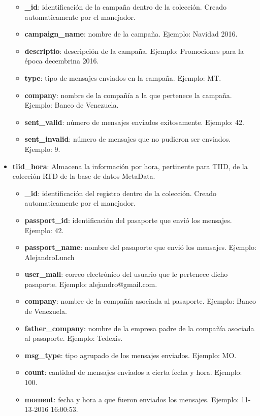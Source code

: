 \begin{itemize}[noitemsep,nolistsep]
\begin{itemize}[noitemsep,nolistsep]
\item \textbf{\_id}: identificación de la campaña dentro de la colección. Creado automaticamente por el manejador.
\item \textbf{campaign\_name}: nombre de la campaña. Ejemplo: Navidad 2016.
\item \textbf{descriptio}: descripción de la campaña. Ejemplo: Promociones para la época decembrina 2016.
\item \textbf{type}: tipo de mensajes enviados en la campaña. Ejemplo: MT.
\item \textbf{company}: nombre de la compañía a la que pertenece la campaña. Ejemplo: Banco de Venezuela.
\item \textbf{sent\_valid}: número de mensajes enviados exitosamente. Ejemplo: 42.
\item \textbf{sent\_invalid}: número de mensajes que no pudieron ser enviados. Ejemplo: 9.
\end{itemize} 
\item \textbf{tiid\_hora}: Almacena la información por hora, pertinente para TIID, de la colección RTD de la base de datos MetaData.
\begin{itemize}[noitemsep,nolistsep]
\item \textbf{\_id}: identificación del registro dentro de la colección. Creado automaticamente por el manejador.
\item \textbf{passport\_id}: identificación del pasaporte que envió los mensajes. Ejemplo: 42.
\item \textbf{passport\_name}: nombre del pasaporte que envió los mensajes. Ejemplo: AlejandroLunch
\item \textbf{user\_mail}: correo electrónico del usuario que le pertenece dicho pasaporte. Ejemplo: alejandro@gmail.com.
\item \textbf{company}: nombre de la compañía asociada al pasaporte. Ejemplo: Banco de Venezuela.
\item \textbf{father\_company}: nombre de la empresa padre de la compañía asociada al pasaporte. Ejemplo: Tedexis.
\item \textbf{msg\_type}: tipo agrupado de los mensajes enviados. Ejemplo: MO.
\item \textbf{count}: cantidad de mensajes enviados a cierta fecha y hora. Ejemplo: 100.
\item \textbf{moment}: fecha y hora a que fueron enviados los mensajes. Ejemplo: 11-13-2016 16:00:53.
\end{itemize} 

\end{itemize}
